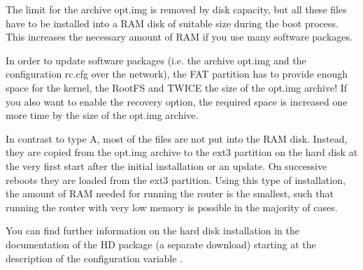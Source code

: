 The limit for the archive opt.img is removed by disk capacity, but all these files
have to be installed into a RAM disk of suitable size during the boot process.
This increases the necessary amount of RAM if you use many software packages.

In order to update software packages (i.e. the archive opt.img and the
configuration rc.cfg over the network), the FAT partition has to provide
enough space for the kernel, the RootFS and TWICE the size of the opt.img
archive! If you also want to enable the recovery option, the required space
is increased one more time by the size of the opt.img archive.


In contrast to type A, most of the files are not put into the RAM disk.
Instead, they are copied from the opt.img archive to the ext3 partition
on the hard disk at the very first start after the initial installation or an
update. On successive reboots they are loaded from the ext3 partition.
Using this type of installation, the amount of RAM needed for running the
router is the smallest, such that running the router with very low memory is
possible in the majority of cases.

You can find further information on the hard disk installation in the
documentation of the HD package (a separate download) starting
at the description of the configuration variable .
